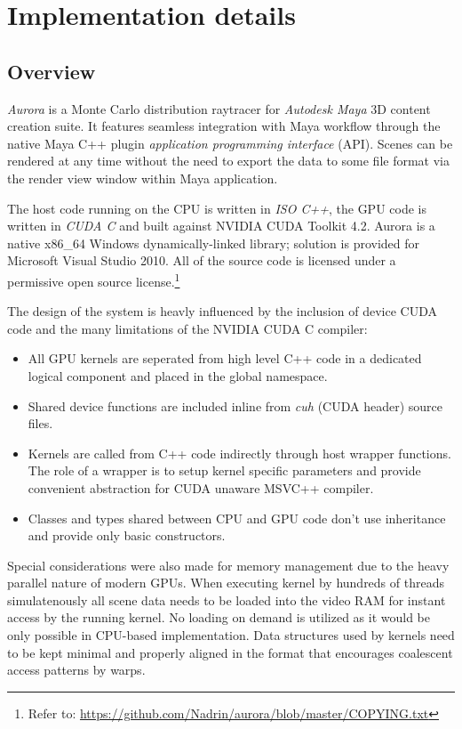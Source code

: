\chapter{Implementation details}

\section{Overview}
\emph{Aurora} is a Monte Carlo distribution raytracer for \emph{Autodesk Maya} 3D content creation suite. It features seamless integration with Maya workflow through the native Maya C++ plugin \emph{application programming interface} (API). Scenes can be rendered at any time without the need to export the data to some file format via the render view window within Maya application.

The host code running on the CPU is written in \emph{ISO C++}, the GPU code is written in \emph{CUDA C} and built against NVIDIA CUDA Toolkit 4.2. Aurora is a native x86\_64 Windows dynamically-linked library; solution is provided for Microsoft Visual Studio 2010. All of the source code is licensed under a permissive open source license.\footnote{Refer to: \url{https://github.com/Nadrin/aurora/blob/master/COPYING.txt}}

The design of the system is heavly influenced by the inclusion of device CUDA code and the many limitations of the NVIDIA CUDA C compiler:
\begin{itemize}
\item All GPU kernels are seperated from high level C++ code in a dedicated logical component and placed in the global namespace.
\item Shared device functions are included inline from \emph{cuh} (CUDA header) source files.
\item Kernels are called from C++ code indirectly through host wrapper functions. The role of a wrapper is to setup kernel specific parameters and provide convenient abstraction for CUDA unaware MSVC++ compiler.
\item Classes and types shared between CPU and GPU code don't use inheritance and provide only basic constructors.
\end{itemize}
Special considerations were also made for memory management due to the heavy parallel nature of modern GPUs. When executing kernel by hundreds of threads simulatenously all scene data needs to be loaded into the video RAM for instant access by the running kernel. No loading on demand is utilized as it would be only possible in CPU-based implementation. Data structures used by kernels need to be kept minimal and properly aligned in the format that encourages coalescent access patterns by warps.


